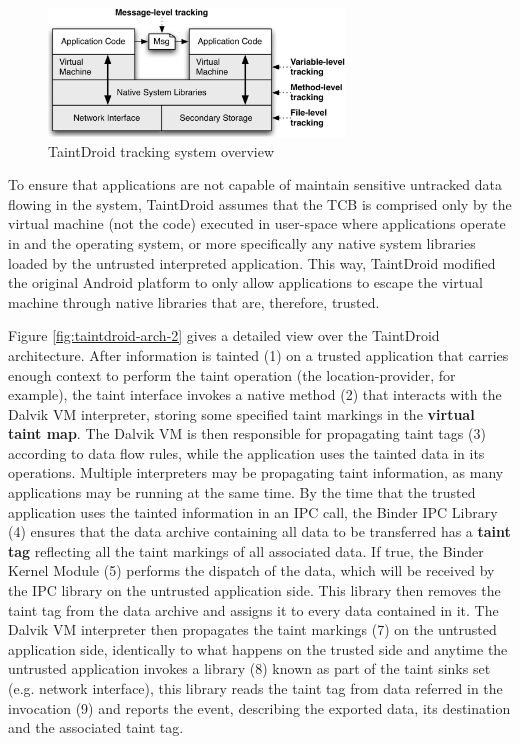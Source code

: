 \begin{figure}[t!]
\includegraphics[width=0.7\textwidth]{figs/taintdroid-arch}
\centering
\caption{TaintDroid tracking system overview}
\label{fig:taintdroid-arch}
\end{figure}

To ensure that applications are not capable of maintain sensitive untracked data flowing in the system, TaintDroid assumes that the TCB is comprised only by the virtual machine (not the code) executed in user-space where applications operate in and the operating system, or more specifically any native system libraries loaded by the untrusted interpreted application. This way, TaintDroid modified the original Android platform to only allow applications to escape the virtual machine through native libraries that are, therefore, trusted.

Figure \ref{fig:taintdroid-arch-2} gives a detailed view over the TaintDroid architecture. After information is tainted (1) on a trusted application that carries enough context to perform the taint operation (the location-provider, for example), the taint interface invokes a native method (2) that interacts with the Dalvik VM interpreter, storing some specified taint markings in the \textbf{virtual taint map}. The Dalvik VM is then responsible for propagating taint tags (3) according to data flow rules, while the application uses the tainted data in its operations. Multiple interpreters may be propagating taint information, as many applications may be running at the same time. By the time that the trusted application uses the tainted information in an IPC call, the Binder IPC Library (4) ensures that the data archive containing all data to be transferred has a \textbf{taint tag} reflecting all the taint markings of all associated data. If true, the Binder Kernel Module (5) performs the dispatch of the data, which will be received by the IPC library on the untrusted application side. This library then removes the taint tag from the data archive and assigns it to every data contained in it. The Dalvik VM interpreter then propagates the taint markings (7) on the untrusted application side, identically to what happens on the trusted side and anytime the untrusted application invokes a library (8) known as part of the taint sinks set (e.g. network interface), this library reads the taint tag from data referred in the invocation (9) and reports the event, describing the exported data, its destination and the associated taint tag.

